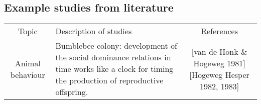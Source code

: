 \subsection{Example studies from literature}

\begin{table} 
    \begin{tabular}{ c p{5cm} c }
        Topic & Description of studies & References \\ 
Animal behaviour & Bumblebee colony: development of the social dominance relations in time works like a clock for timing the production of reproductive offspring. & [van de Honk \& Hogeweg 1981] [Hogeweg \C Hesper 1982, 1983] \\
    \end{tabular} 
\end{table}